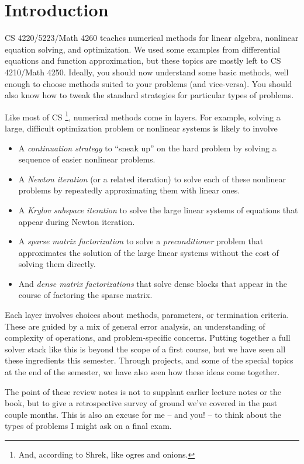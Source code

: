 \documentclass[12pt, leqno]{article}
\begin{document}
\section{Introduction}

CS 4220/5223/Math 4260 teaches numerical methods for linear algebra,
nonlinear equation solving, and optimization.  We used some examples
from differential equations and function approximation, but these
topics are mostly left to CS 4210/Math 4250.  Ideally, you should now
understand some basic methods, well enough to choose methods suited to
your problems (and vice-versa).  You should also know how to tweak the
standard strategies for particular types of problems.

Like most of CS%
\footnote{And, according to Shrek, like ogres and onions.}, numerical
methods come in layers.  For example, solving a large, difficult
optimization problem or nonlinear systems is likely to involve
\begin{itemize}
  \item A {\em continuation strategy} to ``sneak up'' on the hard
    problem by solving a sequence of easier nonlinear problems.
  \item A {\em Newton iteration} (or a related iteration) to solve
    each of these nonlinear problems by repeatedly approximating them
    with linear ones.
  \item A {\em Krylov subspace iteration} to solve the large linear
    systems of equations that appear during Newton iteration.
  \item A {\em sparse matrix factorization} to solve a {\em
    preconditioner} problem that approximates the solution of the
    large linear systems without the cost of solving them directly.
  \item And {\em dense matrix factorizations} that solve dense
    blocks that appear in the course of factoring the sparse matrix.
\end{itemize}
Each layer involves choices about methods, parameters, or termination
criteria.  These are guided by a mix of general error analysis, an
understanding of complexity of operations, and problem-specific
concerns.  Putting together a full solver stack like this is beyond
the scope of a first course, but we have seen all these ingredients
this semester.  Through projects, and some of the special topics at
the end of the semester, we have also seen how these ideas come
together.

The point of these review notes is not to supplant earlier lecture
notes or the book, but to give a retrospective survey of ground
we've covered in the past couple months.  This is also an excuse
for me -- and you! -- to think about the types of problems I might
ask on a final exam.
\end{document}
